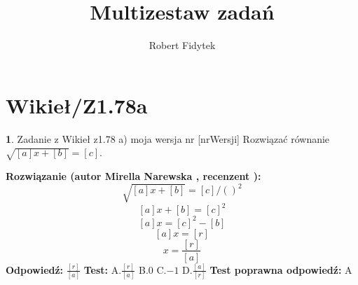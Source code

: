 \documentclass[12pt, a4paper]{article}
\title{Multizestaw zadań}
\author{Robert Fidytek}
\date{}
\theoremstyle{definition} %
\newtheorem{zad}{}
\newcommand{\kategoria}[1]{\section{#1}} %
\newcommand{\zadStart}[1]{\begin{zad}#1\newline} %
\newcommand{\zadStop}{\end{zad}}   %
\newcommand{\rozwStart}[2]{\noindent \textbf{Rozwiązanie (autor #1 , recenzent #2): }\newline} %
\newcommand{\rozwStop}{\newline}                                            %
\newcommand{\odpStart}{\noindent \textbf{Odpowiedź:}\newline}    %
\newcommand{\odpStop}{\newline}                                             %
\newcommand{\testStart}{\noindent \textbf{Test:}\newline} %
\newcommand{\testStop}{\newline} %
\newcommand{\kluczStart}{\noindent \textbf{Test poprawna odpowiedź:}\newline} %
\newcommand{\kluczStop}{\newline} %
\begin{document}
\maketitle


\kategoria{Wikieł/Z1.78a}
\zadStart{Zadanie z Wikieł z1.78 a) moja wersja nr [nrWersji]}
 Rozwiązać równanie $\sqrt{[a]x+[b]}=[c]$.
\zadStop
\rozwStart{Mirella Narewska}{}
$$\sqrt{[a]x+[b]}=[c] /()^2$$
$$[a]x+[b]=[c]^2$$ 
$$[a]x=[c]^2 -[b]$$
$$[a]x=[r]$$ 
$$x=\frac{[r]}{[a]}$$
\rozwStop
\odpStart
$\frac{[r]}{[a]}$
\odpStop
\testStart
A.$\frac{[r]}{[a]}$
B.$0$
C.$-1$
D.$\frac{[a]}{[r]}$
\testStop
\kluczStart
A
\kluczStop
\end{document}
